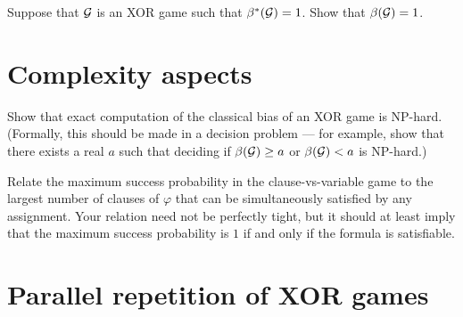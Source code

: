 \begin{exercise}
Suppose that $\mathcal{G}$ is an XOR game such that $\beta^*(\mathcal{G})=1$. Show that $\beta(\mathcal{G})=1$. 
\end{exercise}

\section{Complexity aspects}

\begin{exercise}
Show that exact computation of the classical bias of an XOR game is NP-hard. (Formally, this should be made in a decision problem --- for example, show that there exists a real $a$ such that deciding if $\beta(\mathcal{G})\geq a$ or $\beta(\mathcal{G})<a$ is NP-hard.)
\end{exercise}

\begin{exercise}
Relate the maximum success probability in the clause-vs-variable game to the largest number of clauses of $\varphi$ that can be simultaneously satisfied by any assignment. Your relation need not be perfectly tight, but it should at least imply that the maximum success probability is $1$ if and only if the formula is satisfiable. 
\end{exercise}

\section{Parallel repetition of XOR games}

